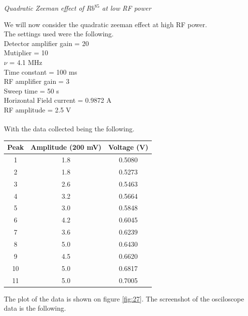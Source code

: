 \documentclass[twocolumn]{article}
\begin{document}
\caption{\textit{Quadratic Zeeman effect of $Rb^{85}$ at low RF power \\ }}
\justify
We will now consider the quadratic zeeman effect at high RF power.
\\
The settings used were the following.
\\
Detector amplifier gain = 20 \\
Mutiplier = 10 \\
$\nu$ = 4.1 MHz \\
Time constant = 100 ms \\
RF amplifier gain = 3 \\
Sweep time = 50 s \\
Horizontal Field current = 0.9872 A \\
RF amplitude = 2.5 V \\
\\
With the data collected being the following.
\begin{minipage}{\linewidth}
\center
\begin{tabular}{|c|c|c|}
\hline
Peak & Amplitude (200 mV) & Voltage (V) \\ \hline
1 & 1.8 & 0.5080 \\ \hline
2 & 1.8 & 0.5273 \\ \hline
3 & 2.6 & 0.5463 \\ \hline
4 & 3.2 & 0.5664 \\ \hline
5 & 3.0 & 0.5848 \\ \hline
6 & 4.2 & 0.6045 \\ \hline
7 & 3.6 & 0.6239 \\ \hline
8 & 5.0 & 0.6430 \\ \hline
9 & 4.5 & 0.6620 \\ \hline
10 & 5.0 & 0.6817 \\ \hline
11 & 5.0 & 0.7005 \\ \hline
\end{tabular}
\label{tbl:11}
\end{minipage}
The plot of the data is shown on figure \ref{fig:27}. The screenshot of the
osciloscope data is the following.
\center
\end{document}
